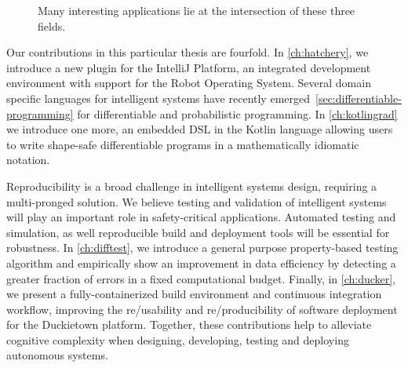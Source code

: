 \begin{figure}
    \caption{Many interesting applications lie at the intersection of these three fields.}
    \label{fig:venn_triagram}
\end{figure}

Our contributions in this particular thesis are fourfold. In \autoref{ch:hatchery}, we introduce a new plugin for the IntelliJ Platform, an integrated development environment with support for the Robot Operating System. Several domain specific languages for intelligent systems have recently emerged~\autoref{sec:differentiable-programming} for differentiable and probabilistic programming. In \autoref{ch:kotlingrad} we introduce one more, an embedded DSL in the Kotlin language allowing users to write shape-safe differentiable programs in a mathematically idiomatic notation.

Reproducibility is a broad challenge in intelligent systems design, requiring a multi-pronged solution. We believe testing and validation of intelligent systems will play an important role in safety-critical applications. Automated testing and simulation, as well reproducible build and deployment tools will be essential for robustness. In \autoref{ch:difftest}, we introduce a general purpose property-based testing algorithm and empirically show an improvement in data efficiency by detecting a greater fraction of errors in a fixed computational budget. Finally, in \autoref{ch:ducker}, we present a fully-containerized build environment and continuous integration workflow, improving the re/usability and re/producibility of software deployment for the Duckietown platform. Together, these contributions help to alleviate cognitive complexity when designing, developing, testing and deploying autonomous systems.